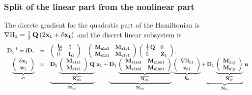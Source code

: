 \documentclass[10pt,a4paper]{article}
\begin{document}
{\subsubsection{Split of the linear part from the nonlinear part}
%
The dicrete gradient for the quadratic part of the Hamiltonian is ${\small \nabla{\mathrm{H}}_{\mathtt{l}} =\frac{1}{2}\,\mathbf{Q}\, (2{\mathbf{x}}_{\mathtt{l}} + \delta {\mathbf{x}}_{\mathtt{l}})}$ and the discret linear subsystem is
%
\begin{equation}
\begin{array}{rcl}
\mathbf{D}_{\mathtt{l}}^{-1} = \mathbf{iD}_{\mathtt{l}} &=& \left(\begin{array}{ll}
\frac{\mathbf{I_d}}{\delta t}&0 \\ 
0 &\mathbf{I_d}
\end{array}\right)-\left(\begin{array}{ll}
\mathbf{M}_{\mathtt{xlxl}}&\mathbf{M}_{\mathtt{xlwl}} \\ 
\mathbf{M}_{\mathtt{wlxl}}&\mathbf{M}_{\mathtt{wlwl}} 
\end{array}\right)\,\left(\begin{array}{ll}
\frac{1}{2}\,\mathbf{Q}&0 \\ 
0 &\mathbf{Z}_{\mathtt{l}}
\end{array}\right),\\
\underbrace{\left(\begin{array}{c}
\delta {\mathbf{x}}_{\mathtt{l}}\\
{\mathbf{w}}_{\mathtt{l}}
\end{array}\right) 
}_{\mathbf{v}_{\mathtt{l}}}
& = &
\underbrace{\mathbf{D}_{\mathtt{l}}\,
\underbrace{\left(\begin{array}{ll}
\mathbf{M}_{\mathtt{xlxl}}\\ 
\mathbf{M}_{\mathtt{wlxl}}
\end{array}\right)\,\mathbf{Q}}_{\overline{\mathbf{N}_{\mathtt{lxl}}}}}_{\mathbf{N}_{\mathtt{lxl}}}
\, 
{\mathbf{x}}_{\mathtt{l}}
+
  \underbrace{\mathbf{D}_{\mathtt{l}}\,
\underbrace{\left(\begin{array}{ll}
\mathbf{M}_{\mathtt{xlxnl}}& \mathbf{M}_{\mathtt{xlwnl}} \\ 
 \mathbf{M}_{\mathtt{wlxnl}}& \mathbf{M}_{\mathtt{wlwnl}} 
\end{array}\right)}_{\overline{\mathbf{N}_{\mathtt{lnl}}}}}_{\mathbf{N}_{\mathtt{lnl}}}
\,
\underbrace{\left(\begin{array}{c}
\nabla{\mathrm{H}}_{\mathtt{nl}}\\
{\mathbf{z}}_{\mathtt{nl}}
\end{array}\right) 
}_{\mathbf{f}_{\mathtt{nl}}}
+
  \underbrace{\mathbf{D}_{\mathtt{l}}\,
\underbrace{\left(\begin{array}{l}
 \mathbf{M}_{\mathtt{xly}}\\ 
 \mathbf{M}_{\mathtt{wly}}
\end{array}\right)}_{\overline{\mathbf{N}_{\mathtt{ly}}}}}_{\mathbf{N}_{\mathtt{ly}}}
\,
{\mathbf{u}}
\end{array}
\end{equation}
%
}
\end{document}
